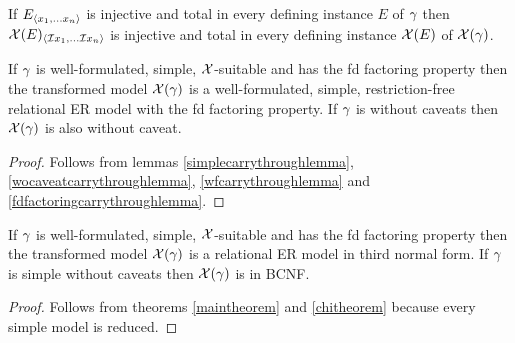 \begin{lemma}
\label{injectivecarrythroughlemma}
If $E_{\langle x_1,...x_n \rangle}$ is
injective and total in every defining instance $E$ of $\gamma$ then $\mathcal{X}(E)_{\langle\mathcal{I}{x}_1,...\mathcal{I}{x}_n \rangle}$ is
injective and total in every defining instance $\mathcal{X}(E)$ of $\mathcal{X}(\gamma)$.
\end{lemma}

\begin{theorem}
\label{chitheorem}
If $\gamma$ is well-formulated, simple, $\mathcal{X}$-suitable and has the fd factoring property
then the transformed model $\mathcal{X}(\gamma)$ is a well-formulated, simple, restriction-free relational ER model with the fd factoring property.   
If $\gamma$ is without caveats then $\mathcal{X}(\gamma)$ is also without caveat.
\end{theorem}
\begin{proof}
Follows from lemmas \ref{simplecarrythroughlemma}, \ref{wocaveatcarrythroughlemma}, \ref{wfcarrythroughlemma} and
\ref{fdfactoringcarrythroughlemma}.
\end{proof}

\begin{corollary}
\label{goalcorollary}
If $\gamma$ is well-formulated, simple, $\mathcal{X}$-suitable and has the fd factoring property
then the transformed model $\mathcal{X}(\gamma)$ is a  relational ER model in third normal form.  
If $\gamma$ is simple without caveats then $\mathcal{X}(\gamma)$ is in BCNF.
\end{corollary}
\begin{proof}
Follows from theorems \ref{maintheorem} and \ref{chitheorem} because every simple model is reduced.
\end{proof}
